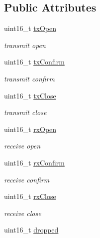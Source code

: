 \subsection*{Public Attributes}
\begin{DoxyCompactItemize}
\item 
uint16\+\_\+t \hyperlink{structns3_1_1dot11s_1_1PeerManagementProtocolMac_1_1Statistics_a123e67cf28f2bc5fc27ae64dea07f5ab}{tx\+Open}
\begin{DoxyCompactList}\small\item\em transmit open \end{DoxyCompactList}\item 
uint16\+\_\+t \hyperlink{structns3_1_1dot11s_1_1PeerManagementProtocolMac_1_1Statistics_a355443c5159b773a2506e919d97df368}{tx\+Confirm}
\begin{DoxyCompactList}\small\item\em transmit confirm \end{DoxyCompactList}\item 
uint16\+\_\+t \hyperlink{structns3_1_1dot11s_1_1PeerManagementProtocolMac_1_1Statistics_a7f74d573fa1dd232091d43a96294b188}{tx\+Close}
\begin{DoxyCompactList}\small\item\em transmit close \end{DoxyCompactList}\item 
uint16\+\_\+t \hyperlink{structns3_1_1dot11s_1_1PeerManagementProtocolMac_1_1Statistics_aade324d2b21b1f3cd47e95dd6057a1eb}{rx\+Open}
\begin{DoxyCompactList}\small\item\em receive open \end{DoxyCompactList}\item 
uint16\+\_\+t \hyperlink{structns3_1_1dot11s_1_1PeerManagementProtocolMac_1_1Statistics_a6e0fcebfd07b428ac04e6a81ecf9fc77}{rx\+Confirm}
\begin{DoxyCompactList}\small\item\em receive confirm \end{DoxyCompactList}\item 
uint16\+\_\+t \hyperlink{structns3_1_1dot11s_1_1PeerManagementProtocolMac_1_1Statistics_a6f248487a20fb8294d3eb5357f1680e3}{rx\+Close}
\begin{DoxyCompactList}\small\item\em receive close \end{DoxyCompactList}\item 
uint16\+\_\+t \hyperlink{structns3_1_1dot11s_1_1PeerManagementProtocolMac_1_1Statistics_a9c584bdb0d2f08ee00a2bd3ec4b4b062}{dropped}

\end{DoxyCompactItemize}
